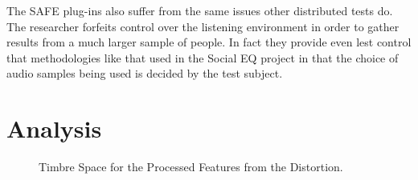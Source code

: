 		The SAFE plug-ins also suffer from the same issues other distributed tests do. The researcher forfeits
		control over the listening environment in order to gather results from a much larger sample of people. In
		fact they provide even lest control that methodologies like that used in the Social EQ project
		\citep{cartwright2013socialeq} in that the choice of audio samples being used is decided by the test
		subject. 

\section{Analysis}
\label{sec:TimbreEvaluation-Analysis}

	\begin{figure}[h!]
		\centering
		\qquad
		\caption{Timbre Space for the Processed Features from the Distortion.}
		\label{fig:DistortionProcessedMDSs}
	\end{figure}


